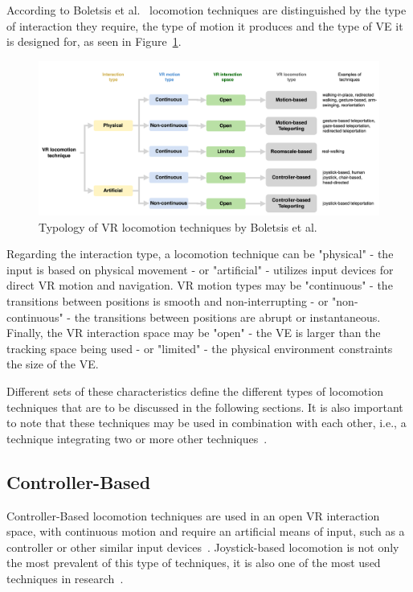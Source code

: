 According to Boletsis et al.~\cite{Boletsis2022} locomotion techniques are distinguished by the type of interaction they require, 
the type of motion it produces and the type of \gls{VE} it is designed for, as seen in Figure~\ref{fig:vr-locomotion-typology}.
\begin{figure}[t]
    \centering
    \includegraphics[width=\textwidth]{NOVAthesisFiles/Images/papers/vr-locomotion-typology.png}
    \caption[Typology of \gls{VR} locomotion techniques]{Typology of \gls{VR} locomotion techniques by Boletsis et al.~\cite{Boletsis2022}}
    \label{fig:vr-locomotion-typology}
\end{figure}

Regarding the interaction type, a locomotion technique can be "physical" - 
the input is based on physical movement - or "artificial" - utilizes input devices for direct \gls{VR} motion and navigation.
\gls{VR} motion types may be "continuous" - the transitions between positions is smooth and non-interrupting - 
or "non-continuous" - the transitions between positions are abrupt or instantaneous.
Finally, the \gls{VR} interaction space may be "open" - the \gls{VE} is larger than the tracking space being used - 
or "limited" - the physical environment constraints the size of the \gls{VE}.

Different sets of these characteristics define the different types of 
locomotion techniques that are to be discussed in the following sections. 
It is also important to note that these techniques may be used in combination with each other, 
i.e., a technique integrating two or more other techniques~\cite{Boletsis2022}.

\subsection{Controller-Based}
\label{sec:controller-based}


Controller-Based locomotion techniques are used in an open \gls{VR} interaction space, with continuous motion and require 
an artificial means of input, such as a controller or other similar input devices~\cite{Boletsis2017}.
Joystick-based locomotion is not only the most prevalent of this type of techniques, it is also one of the most used 
techniques in research~\cite{Boletsis2022}.

